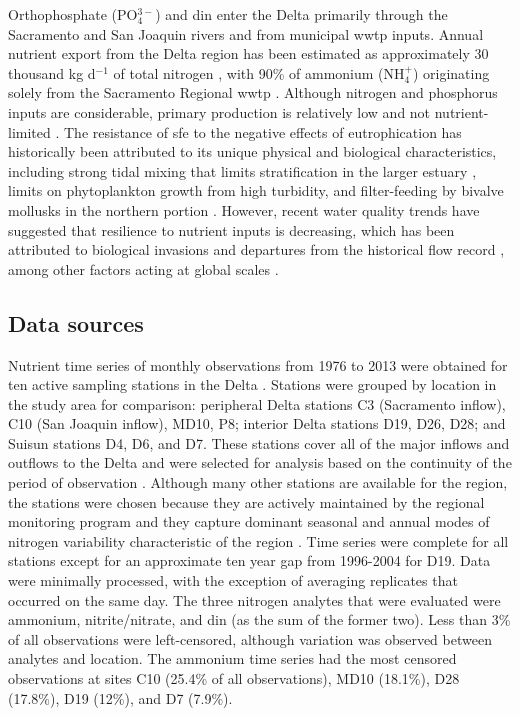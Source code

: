 \documentclass[letterpaper,12pt,oneside]{article}\usepackage[]{graphicx}\usepackage[]{color}
\begin{document}
Orthophosphate (PO$_4^{3-}$) and \ac{din} enter the Delta primarily through the Sacramento and San Joaquin rivers and from municipal \ac{wwtp} inputs.  Annual nutrient export from the Delta region has been estimated as approximately 30 thousand kg d$^{-1}$ of total nitrogen \citep[varying with flow,][]{Novick15}, with 90\% of ammonium (NH$_4^{+}$) originating solely from the Sacramento Regional \ac{wwtp} \citep{Jassby08}.  Although nitrogen and phosphorus inputs are considerable, primary production is relatively low and not nutrient-limited \citep{Jassby02,Kimmerer12}.  The resistance of \ac{sfe} to the negative effects of eutrophication has historically been attributed to its unique physical and biological characteristics, including strong tidal mixing that limits stratification in the larger estuary \citep{Cloern96,Thompson08}, limits on phytoplankton growth from high turbidity, and filter-feeding by bivalve mollusks in the northern portion \citep{Thompson08,Crauder16}.  However, recent water quality trends have suggested that resilience to nutrient inputs is decreasing\citep{Lehman05,Cloern07,Lehman10}, which has been attributed to biological invasions \citep{Cohen98} and departures from the historical flow record \citep{Enright09,Cloern12b}, among other factors acting at global scales \citep[e.g., variation in sea surface temperatures,][]{Cloern07}.

\subsection{Data sources}



Nutrient time series of monthly observations from 1976 to 2013 were obtained for ten active sampling stations in the Delta \citep[\cref{fig:delt_map,tab:stdescrp},][]{IEP13}.  Stations were grouped by location in the study area for comparison: peripheral Delta stations C3 (Sacramento inflow), C10 (San Joaquin inflow), MD10, P8; interior Delta stations D19, D26, D28; and Suisun stations D4, D6, and D7.  These stations cover all of the major inflows and outflows to the Delta and were selected for analysis based on the continuity of the period of observation \citep{Jabusch09}. Although many other stations are available for the region, the stations were chosen because they are actively maintained by the regional monitoring program and they capture dominant seasonal and annual modes of nitrogen variability characteristic of the region \citep{Jabusch16}. Time series were complete for all stations except for an approximate ten year gap from 1996-2004 for D19.  Data were minimally processed, with the exception of averaging replicates that occurred on the same day.  The three nitrogen analytes that were evaluated were ammonium, nitrite/nitrate, and \ac{din} (as the sum of the former two). Less than 3\% of all observations were left-censored, although variation was observed between analytes and location.  The ammonium time series had the most censored observations at sites C10 (25.4\% of all observations), MD10 (18.1\%), D28 (17.8\%), D19 (12\%), and D7 (7.9\%).
\end{document}
